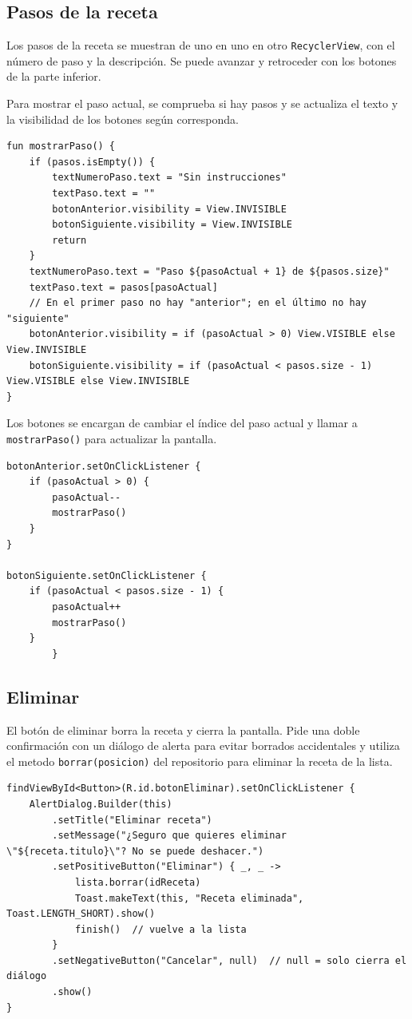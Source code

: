 \subsection{Pasos de la receta}
Los pasos de la receta se muestran de uno en uno en otro \texttt{RecyclerView}, con el número de paso y la descripción. Se puede avanzar y retroceder con los botones de la parte inferior.

Para mostrar el paso actual, se comprueba si hay pasos y se actualiza el texto y la visibilidad de los botones según corresponda.

\begin{lstlisting}
fun mostrarPaso() {
    if (pasos.isEmpty()) {
        textNumeroPaso.text = "Sin instrucciones"
        textPaso.text = ""
        botonAnterior.visibility = View.INVISIBLE
        botonSiguiente.visibility = View.INVISIBLE
        return
    }
    textNumeroPaso.text = "Paso ${pasoActual + 1} de ${pasos.size}"
    textPaso.text = pasos[pasoActual]
    // En el primer paso no hay "anterior"; en el último no hay "siguiente"
    botonAnterior.visibility = if (pasoActual > 0) View.VISIBLE else View.INVISIBLE
    botonSiguiente.visibility = if (pasoActual < pasos.size - 1) View.VISIBLE else View.INVISIBLE
}
\end{lstlisting}

Los botones se encargan de cambiar el índice del paso actual y llamar a \texttt{mostrarPaso()} para actualizar la pantalla.

\begin{lstlisting}
botonAnterior.setOnClickListener {
    if (pasoActual > 0) {
        pasoActual--
        mostrarPaso()
    }
}

botonSiguiente.setOnClickListener {
    if (pasoActual < pasos.size - 1) {
        pasoActual++
        mostrarPaso()
    }
        }
\end{lstlisting}

\subsection{Eliminar}
El botón de eliminar borra la receta y cierra la pantalla.
Pide una doble confirmación con un diálogo de alerta para evitar borrados accidentales y utiliza el metodo \texttt{borrar(posicion)} del repositorio para eliminar la receta de la lista.

\begin{lstlisting}
findViewById<Button>(R.id.botonEliminar).setOnClickListener {
    AlertDialog.Builder(this)
        .setTitle("Eliminar receta")
        .setMessage("¿Seguro que quieres eliminar \"${receta.titulo}\"? No se puede deshacer.")
        .setPositiveButton("Eliminar") { _, _ ->
            lista.borrar(idReceta)
            Toast.makeText(this, "Receta eliminada", Toast.LENGTH_SHORT).show()
            finish()  // vuelve a la lista
        }
        .setNegativeButton("Cancelar", null)  // null = solo cierra el diálogo
        .show()
}
\end{lstlisting}

